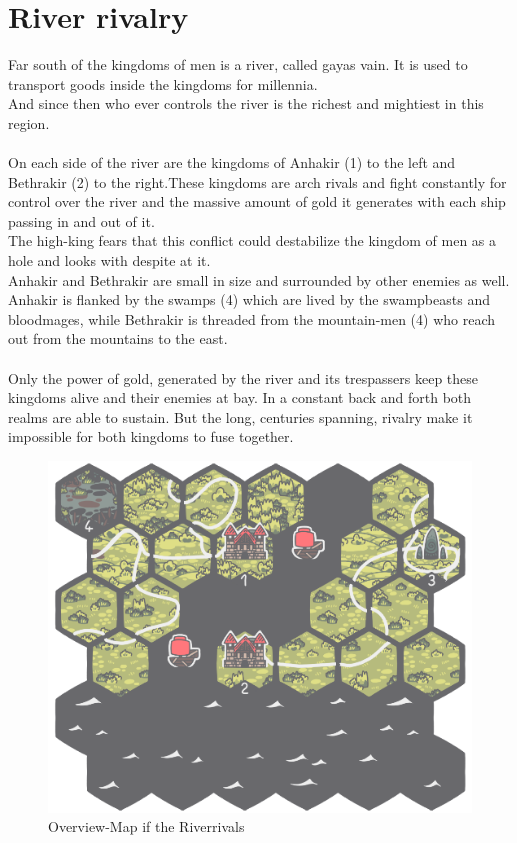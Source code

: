 \documentclass[a5paper,pagesize,10pt,bibtotoc,pointlessnumbers,
normalheadings,DIV=9,twoside=false]{scrbook}
\begin{document}
\section{River rivalry}

Far south of the kingdoms of men is a river, called gayas vain. It is used to transport goods inside the kingdoms for millennia.\\
And since then who ever controls the river is the richest and mightiest in this region.\\
\\
On each side of the river are the kingdoms of Anhakir (1) to the left and Bethrakir (2) to the right.These kingdoms are arch rivals and fight constantly for control over the river and the massive amount of gold it generates with each ship passing in and out of it.\\
The high-king fears that this conflict could destabilize the kingdom of men as a hole and looks with despite at it.\\
Anhakir and Bethrakir are small in size and surrounded by other enemies as well.\\
Anhakir is flanked by the swamps (4) which are lived by the swampbeasts and bloodmages, while Bethrakir is threaded from the mountain-men (4) who reach out from the mountains to the east.\\
\\
Only the power of gold, generated by the river and its trespassers keep these kingdoms alive and their enemies at bay. In a constant back and forth both realms are able to sustain. But the long, centuries spanning, rivalry make it impossible for both kingdoms to fuse together.

\begin{figure}[t]
\includegraphics[scale=0.5]{RiverClash}
\centering
\caption{Overview-Map if the Riverrivals}
\end{figure}
\end{document}
